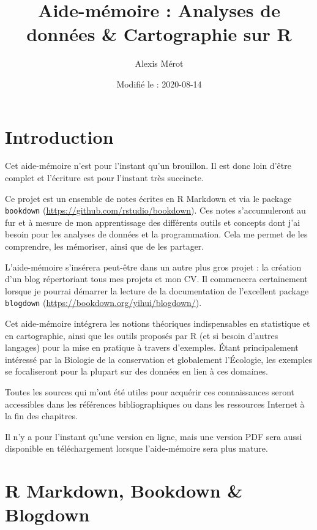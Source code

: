 \documentclass[
  french,
]{book}
\title{Aide-mémoire : Analyses de données \& Cartographie sur R}
\author{Alexis Mérot}
\date{Modifié le : 2020-08-14}
\newenvironment{infobox}[1]
  {
  \begin{itemize}
  \renewcommand{\labelitemi}{
    \raisebox{-.7\height}[0pt][0pt]{
      {\setkeys{Gin}{width=3em,keepaspectratio}
        \texttt{[image: images/\#1]}}
    }
  }
  \setlength{\fboxsep}{1em}
  \begin{blackbox}
  \item
  }
  {
  \end{blackbox}
  \end{itemize}
  }
\begin{document}
\maketitle

{
\setcounter{tocdepth}{1}
\tableofcontents
}
\hypertarget{introduction}{%
\chapter*{Introduction}\label{introduction}}

\begin{infobox}{caution}

Cet aide-mémoire n'est pour l'instant qu'un brouillon. Il est donc loin d'être complet et l'écriture est pour l'instant très succincte.

\end{infobox}

Ce projet est un ensemble de notes écrites en R Markdown \citep{R-rmarkdown} et via
le package \texttt{bookdown} (\url{https://github.com/rstudio/bookdown}). Ces notes
s'accumuleront au fur et à mesure de mon apprentissage des différents outils et
concepts dont j'ai besoin pour les analyses de données et la programmation. Cela
me permet de les comprendre, les mémoriser, ainsi que de les partager.

L'aide-mémoire s'insérera peut-être dans un autre plus gros projet : la création
d'un blog répertoriant tous mes projets et mon CV. Il commencera certainement
lorsque je pourrai démarrer la lecture de la documentation de l'excellent
package \texttt{blogdown} (\url{https://bookdown.org/yihui/blogdown/}).

Cet aide-mémoire intégrera les notions théoriques indispensables en statistique
et en cartographie, ainsi que les outils proposés par R (et si besoin d'autres
langages) pour la mise en pratique à travers d'exemples. Étant principalement
intéressé par la Biologie de la conservation et globalement l'Écologie, les
exemples se focaliseront pour la plupart sur des données en lien à ces domaines.

Toutes les sources qui m'ont été utiles pour acquérir ces connaissances seront
accessibles dans les références bibliographiques ou dans les ressources Internet
à la fin des chapitres.

Il n'y a pour l'instant qu'une version en ligne, mais une version PDF sera aussi disponible en téléchargement lorsque l'aide-mémoire sera plus mature.

\hypertarget{rmarkdown}{%
\chapter{R Markdown, Bookdown \& Blogdown}\label{rmarkdown}}
\end{document}

